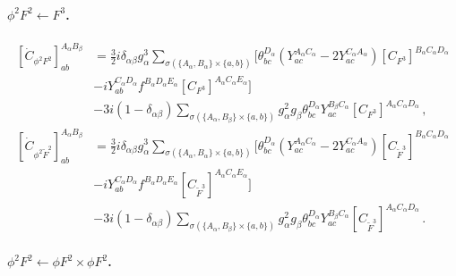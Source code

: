 \paragraph{\texorpdfstring{$\phi^2F^2\leftarrow F^3$}{phiF2fromF3}.}
\label{par:phi2F2<-F3}

\begin{align}
    \left[\dot{C}_{\phi^2 F^2}\right]_{ab}^{A_\alpha B_\beta} &= \frac{3}{2}i\delta_{\alpha\beta}g_\alpha^3 
    \sum_{\sigma(\{A_\alpha,B_\alpha\}\times\{a,b\})}
    \Big[
    \theta^{D_\alpha}_{bc}
    \left(Y_{ac}^{A_\alpha C_\alpha}-2 Y_{ac}^{C_\alpha A_\alpha}\right)
    \left[ C_{F^3}\right]^{B_\alpha C_\alpha D_\alpha}\nonumber\\
    &-i Y_{ab}^{C_\alpha D_\alpha}
    f^{B_\alpha D_\alpha E_\alpha}\left[ C_{F^3}\right]^{A_\alpha C_\alpha E_\alpha}
    \Big]\nonumber \\
    &- 3i(1-\delta_{\alpha\beta}) 
    \sum_{\sigma(\{A_\alpha,B_\beta\}\times\{a,b\})}
    g^2_\alpha g_\beta 
    \theta^{D_\alpha}_{bc}Y^{B_\beta C_\alpha}_{ac}
    \left[ C_{F^3}\right]^{A_\alpha C_\alpha D_\alpha}\,,\label{eq:CF3_to_Cphi2F2}
\\
    \left[\dot{C}_{\phi^2 \widetilde F^2}\right]_{ab}^{A_\alpha B_\beta} &= \frac{3}{2}i\delta_{\alpha\beta}g_\alpha^3 
    \sum_{\sigma(\{A_\alpha,B_\alpha\}\times\{a,b\})}
    \Big[
    \theta^{D_\alpha}_{bc}
    \left(Y_{ac}^{A_\alpha C_\alpha}-2 Y_{ac}^{C_\alpha A_\alpha}\right)
    \left[C_{\widetilde F^3}\right]^{B_\alpha C_\alpha D_\alpha}\nonumber\\
    &-i Y_{ab}^{C_\alpha D_\alpha}
    f^{B_\alpha D_\alpha E_\alpha}\left[  C_{\widetilde F^3}\right]^{A_\alpha C_\alpha E_\alpha}
    \Big]\nonumber \\
    &- 3i(1-\delta_{\alpha\beta}) 
    \sum_{\sigma(\{A_\alpha,B_\beta\}\times\{a,b\})}
    g^2_\alpha g_\beta 
    \theta^{D_\alpha}_{bc}Y^{B_\beta C_\alpha}_{ac}
    \left[  C_{\widetilde F^3}\right]^{A_\alpha C_\alpha D_\alpha}\,.
\end{align}

\paragraph{\texorpdfstring{$\phi^2F^2\leftarrow \phi F^2\times\phi F^2$}{phiF2fromphiF2xphiF2}.}
\label{par:phi2F2<-phiF2xphiF2}

